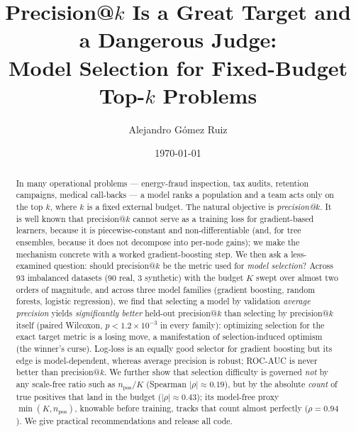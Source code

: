 \documentclass[11pt]{article}
\title{Precision@$k$ Is a Great Target and a Dangerous Judge:\\
Model Selection for Fixed-Budget Top-$k$ Problems}
\author[1]{Alejandro G\'omez Ruiz}
\affil[1]{Independent Researcher \\ \texttt{alejandrogomez1997@gmail.com}}
\date{\today}
\begin{document}
\maketitle

\begin{abstract}
In many operational problems --- energy-fraud inspection, tax audits, retention
campaigns, medical call-backs --- a model ranks a population and a team acts only on the
top $k$, where $k$ is a fixed external budget. The natural objective is
\emph{precision@$k$}. It is well known that precision@$k$ cannot serve as a training loss
for gradient-based learners, because it is piecewise-constant and non-differentiable (and, for
tree ensembles, because it does not decompose into per-node gains); we make the mechanism
concrete with a worked gradient-boosting step. We then ask a less-examined question: should
precision@$k$ be the metric used for \emph{model selection}? Across 93 imbalanced datasets
(90 real, 3 synthetic) with the budget $K$ swept over almost two orders of magnitude, and across
three model families (gradient boosting, random forests, logistic regression), we find that
selecting a model by validation \emph{average precision} yields \emph{significantly better}
held-out precision@$k$ than selecting by precision@$k$ itself (paired Wilcoxon,
$p<1.2\times10^{-3}$ in every family): optimizing selection for the exact target metric is a
losing move, a manifestation of selection-induced optimism (the winner's curse). Log-loss is
an equally good selector for gradient boosting but its edge is model-dependent, whereas
average precision is robust; ROC-AUC is never better than precision@$k$. We
further show that selection difficulty is governed \emph{not} by any scale-free ratio such
as $n_{\text{pos}}/K$ (Spearman $|\rho|\!\approx\!0.19$), but by the absolute
\emph{count} of true positives that land in the budget ($|\rho|\!\approx\!0.43$); its
model-free proxy $\min(K, n_{\text{pos}})$, knowable before training, tracks that count
almost perfectly ($\rho\!=\!0.94$). We give practical recommendations and release all code.
\end{abstract}
\end{document}
